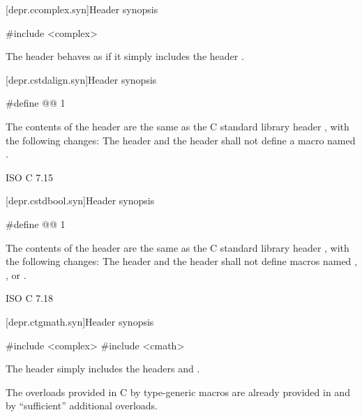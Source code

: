 [depr.ccomplex.syn]{Header  synopsis}
%

\begin{codeblock}
#include <complex>
\end{codeblock}

\pnum
The header 
behaves as if it simply includes the header
.

[depr.cstdalign.syn]{Header  synopsis}

%
%
\begin{codeblock}
#define @@ 1
\end{codeblock}

\pnum
{}%
%
The contents of the header  are the same as the C
standard library header , with the following changes:
The header  and the header  shall not
define a macro named .

\xref ISO C 7.15

[depr.cstdbool.syn]{Header  synopsis}

%
%
\begin{codeblock}
#define @@ 1
\end{codeblock}

\pnum
{}%
The contents of the header  are the same as the C
standard library header , with the following changes:
The header  and the header  shall not
define macros named , , or .

\xref ISO C 7.18

[depr.ctgmath.syn]{Header  synopsis}

%
\begin{codeblock}
#include <complex>
#include <cmath>
\end{codeblock}

\pnum
The header  simply includes the headers
and .

\pnum
\begin{note} The overloads provided in C by type-generic macros are already
provided in  and  by ``sufficient'' additional
overloads.\end{note}

